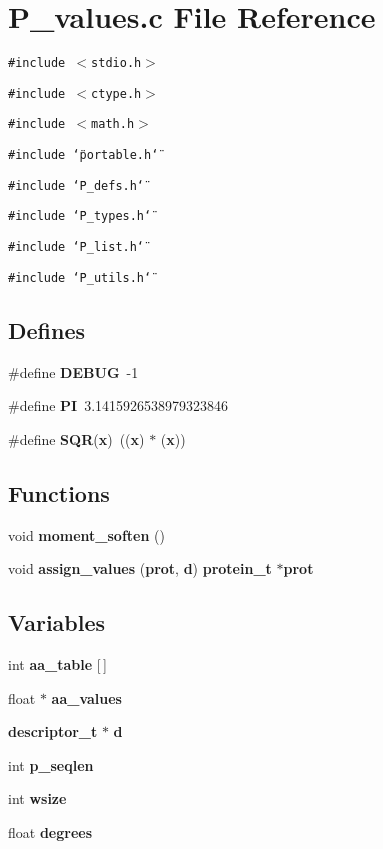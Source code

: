 \section{P\_\-values.c File Reference}
\label{P__values_8c}
{\tt \#include $<$stdio.h$>$}\par
{\tt \#include $<$ctype.h$>$}\par
{\tt \#include $<$math.h$>$}\par
{\tt \#include \char`\"{}portable.h\char`\"{}}\par
{\tt \#include \char`\"{}P\_\-defs.h\char`\"{}}\par
{\tt \#include \char`\"{}P\_\-types.h\char`\"{}}\par
{\tt \#include \char`\"{}P\_\-list.h\char`\"{}}\par
{\tt \#include \char`\"{}P\_\-utils.h\char`\"{}}\par
\subsection*{Defines}
\begin{CompactItemize}
\item 
\#define {\bf DEBUG}\ -1
\item 
\#define {\bf PI}\ 3.1415926538979323846
\item 
\#define {\bf SQR}({\bf x})\ (({\bf x}) $\ast$ ({\bf x}))
\end{CompactItemize}
\subsection*{Functions}
\begin{CompactItemize}
\item 
void {\bf moment\_\-soften} ()
\item 
void {\bf assign\_\-values} ({\bf prot}, {\bf d}) {\bf protein\_\-t} $\ast${\bf prot}
\end{CompactItemize}
\subsection*{Variables}
\begin{CompactItemize}
\item 
int {\bf aa\_\-table} [$\,$]
\item 
float $\ast$ {\bf aa\_\-values}
\item 
{\bf descriptor\_\-t} $\ast$ {\bf d}
\item 
int {\bf p\_\-seqlen}
\item 
int {\bf wsize}
\item 
float {\bf degrees}
\end{CompactItemize}


